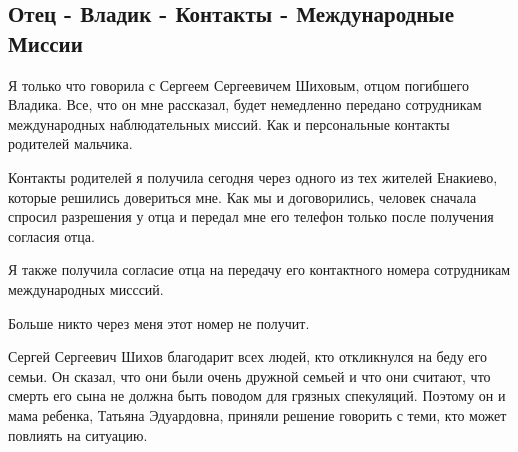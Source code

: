  
 
 
 
 

\subsection{Отец - Владик - Контакты - Международные Миссии}

Я только что говорила с Сергеем Сергеевичем Шиховым, отцом погибшего Владика.
Все, что он мне рассказал, будет немедленно передано сотрудникам международных
наблюдательных миссий. Как и персональные контакты родителей мальчика. 

Контакты родителей я получила сегодня через одного из тех жителей Енакиево,
которые решились довериться мне. Как мы и договорились, человек сначала спросил
разрешения у отца и передал мне его телефон только после получения согласия
отца. 

Я также получила согласие отца на передачу его контактного номера сотрудникам международных мисссий. 

Больше никто через меня этот номер не получит. 

Сергей Сергеевич Шихов благодарит всех людей, кто откликнулся на беду его
семьи. Он сказал, что они были очень дружной семьей и что они считают, что
смерть его сына не должна быть поводом для грязных спекуляций. Поэтому он и
мама ребенка, Татьяна Эдуардовна, приняли решение говорить с теми, кто может
повлиять на ситуацию.
